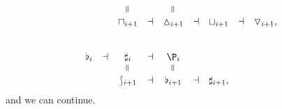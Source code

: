 \documentclass[a4paper]{memoir}
\begin{document}
\begin{example}
\begin{itemize}
\begin{itemize}
\begin{itemize}
\[\begin{array}{c c c c c c c c c}
						&&
						\rotatebox{90}{$=$}
						&&
						\rotatebox{90}{$=$}
						&&
						\\
						&&
						\cohpi_{i+1}
						&\dashv&
						\cohdisc_{i+1}
						&\dashv&
						\cohfget_{i+1}
						&\dashv&
						\cohcodisc_{i+1},
						\\
						\phantom{a}
						\\
						\phantom{a}
						\\
						\flat_i
						&\dashv&
						\sharp_i
						&\dashv&
						\coshp_i
						\\
						&&
						\rotatebox{90}{$=$}
						&&
						\rotatebox{90}{$=$}
						&&
						\\
						&&
						\shp_{i+1}
						&\dashv&
						\flat_{i+1}
						&\dashv&
						\sharp_{i+1},
					\end{array}
				\]
				and we can continue.
			\end{itemize}
		\end{itemize}
	\end{itemize}
\end{example}
\end{document}
